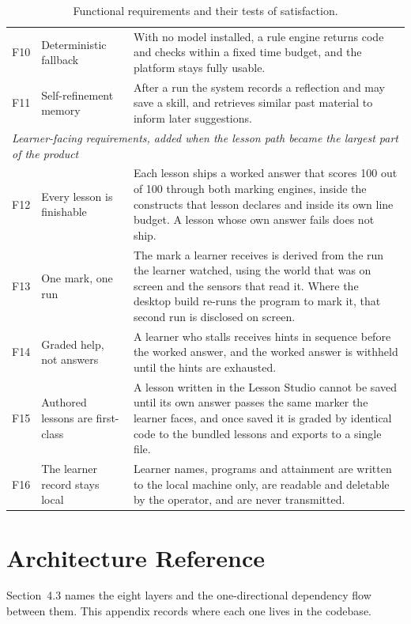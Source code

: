 \documentclass[11pt,a4paper]{report}
\begin{document}
\begin{table}[h]
\begin{tabular}{p{1.2cm}p{4.6cm}p{8.2cm}}
F10 & Deterministic fallback & With no model installed, a rule engine returns code and checks within a fixed time budget, and the platform stays fully usable. \\
F11 & Self-refinement memory & After a run the system records a reflection and may save a skill, and retrieves similar past material to inform later suggestions. \\
\midrule
\multicolumn{3}{l}{\emph{Learner-facing requirements, added when the lesson path became the largest part of the product}} \\
\midrule
F12 & Every lesson is finishable & Each lesson ships a worked answer that scores 100 out of 100 through both marking engines, inside the constructs that lesson declares and inside its own line budget. A lesson whose own answer fails does not ship. \\
F13 & One mark, one run & The mark a learner receives is derived from the run the learner watched, using the world that was on screen and the sensors that read it. Where the desktop build re-runs the program to mark it, that second run is disclosed on screen. \\
F14 & Graded help, not answers & A learner who stalls receives hints in sequence before the worked answer, and the worked answer is withheld until the hints are exhausted. \\
F15 & Authored lessons are first-class & A lesson written in the Lesson Studio cannot be saved until its own answer passes the same marker the learner faces, and once saved it is graded by identical code to the bundled lessons and exports to a single file. \\
F16 & The learner record stays local & Learner names, programs and attainment are written to the local machine only, are readable and deletable by the operator, and are never transmitted. \\
\bottomrule
\end{tabular}
\caption{Functional requirements and their tests of satisfaction.}
\label{tab:frs}
\end{table}

\chapter{Architecture Reference}
\label{app:arch}
Section~4.3 names the eight layers and the one-directional dependency flow between them. This appendix records where each one lives in the codebase.
\end{document}
